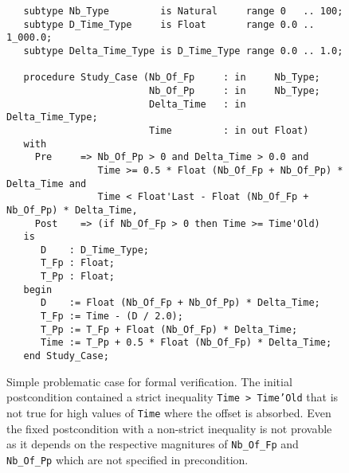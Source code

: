 \documentclass{eceasst}
\begin{document}
\begin{figure}
\begin{lstlisting}
   subtype Nb_Type         is Natural     range 0   .. 100;
   subtype D_Time_Type     is Float       range 0.0 .. 1_000.0;
   subtype Delta_Time_Type is D_Time_Type range 0.0 .. 1.0;

   procedure Study_Case (Nb_Of_Fp     : in     Nb_Type;
                         Nb_Of_Pp     : in     Nb_Type;
                         Delta_Time   : in     Delta_Time_Type;
                         Time         : in out Float)
   with
     Pre     => Nb_Of_Pp > 0 and Delta_Time > 0.0 and
                Time >= 0.5 * Float (Nb_Of_Fp + Nb_Of_Pp) * Delta_Time and
                Time < Float'Last - Float (Nb_Of_Fp + Nb_Of_Pp) * Delta_Time,
     Post    => (if Nb_Of_Fp > 0 then Time >= Time'Old)
   is
      D    : D_Time_Type;
      T_Fp : Float;
      T_Pp : Float;
   begin
      D    := Float (Nb_Of_Fp + Nb_Of_Pp) * Delta_Time;
      T_Fp := Time - (D / 2.0);
      T_Pp := T_Fp + Float (Nb_Of_Fp) * Delta_Time;
      Time := T_Pp + 0.5 * Float (Nb_Of_Fp) * Delta_Time;
   end Study_Case;
\end{lstlisting}
\caption{Simple problematic case for formal verification. The initial
  postcondition contained a strict inequality \texttt{Time > Time'Old} that is
  not true for high values of \texttt{Time} where the offset is absorbed. Even
  the fixed postcondition with a non-strict inequality is not provable as it
  depends on the respective magnitures of \texttt{Nb\_Of\_Fp} and \texttt{Nb\_Of\_Pp}
  which are not specified in precondition.}
\label{fig:float-case}
\end{figure}
\end{document}
